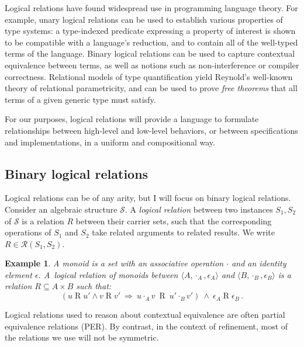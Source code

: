 \documentclass[11pt,oneside,draft]{book}
\newtheorem{example}[theorem]{Example}
\theoremstyle{definition}
\begin{document}
Logical relations have found widespread use in programming language theory.
For example,
unary logical relations can be used to establish
various properties of type systems:
a type-indexed predicate expressing a property of interest
is shown to be compatible with a language's reduction,
and to contain all of the well-typed terms of the language.
Binary logical relations can be used to capture
contextual equivalence between terms,
as well as notions such as non-interference or compiler correctness.
Relational models of type quantification yield
Reynold's well-known theory of relational parametricity,
and can be used to prove \emph{free theorems} that
all terms of a given generic type must satisfy.

For our purposes,
logical relations will provide a language to formulate
relationships between high-level and low-level behaviors,
or between specifications and implementations,
in a uniform and compositional way.


\subsection{Binary logical relations}

Logical relations can be of any arity,
but
I will focus on
binary logical relations.
Consider an algebraic structure $\mathcal{S}$.
A \emph{logical relation}
between two instances $S_1, S_2$ of $\mathcal{S}$
is a relation $R$
between their carrier sets,
such that the corresponding operations of $S_1$ and $S_2$
take related arguments to related results.
We write $R \in \mathcal{R}(S_1, S_2)$.

\begin{example}%
\label{ex:monoid}
A monoid is a set with
an associative operation $\cdot$ and
an identity element $\epsilon$.
A~\emph{logical relation of monoids} between
$\langle A, \cdot_A, \epsilon_A \rangle$ and
$\langle B, \cdot_B, \epsilon_B \rangle$
is a relation $R \subseteq A \times B$
such that:
\begin{equation}
\label{eqn:monoidrel}
(u \mathrel{R} u' \wedge v \mathrel{R} v' \: \Rightarrow \:
 u \cdot_A v \: \mathrel{R} \: u' \cdot_B v')
\: \wedge \:
\epsilon_A \mathrel{R} \epsilon_B \,.
\end{equation}
\end{example}

Logical relations used to reason about contextual equivalence
are often partial equivalence relations (PER).
By contrast, in the context of refinement,
most of the relations we use will not be symmetric.
\end{document}
